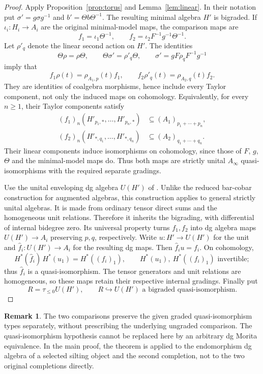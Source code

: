 \documentclass[12pt,a4paper,english,reqno]{amsart}
\theoremstyle{plain}
\theoremstyle{definition}
\newtheorem{rmk}[thm]{Remark}
\numberwithin{equation}{section}
\newcommand{\prpref}[1]{Proposition~\ref{#1}}
\newcommand{\lemref}[1]{Lemma~\ref{#1}}
\def\io{\iota}
\def\ro{\rho}
\def\si{\sigma}
\def\ta{\tau}
\def\Th{\Theta}
\def\incl{\hookrightarrow}
\def\Ainf{A_\infty}
\begin{document}
\begin{proof}
Apply \prpref{prop:torus} and \lemref{lem:linear}. In their notation put $\si'=g\si g^{-1}$ and $b'=\Th b\Th^{-1}$. The resulting minimal algebra $H'$ is bigraded. If $\io_i:H_i\to A_i$ are the original minimal-model maps, the comparison maps are
\[
 f_1=\io_1\Th^{-1},\qquad
 f_2=\io_2F^{-1}g^{-1}\Th^{-1}.
\]
Let $\ro'_q$ denote the linear second action on $H'$. The identities
\[
 \Th\ro=\ro\Th,\qquad
 \Th\si'=\ro'_q\Th,\qquad
 \si'=gF\ro_qF^{-1}g^{-1}
\]
imply that
\[
 f_1\ro(t)=\ro_{A_1,p}(t)f_1,\qquad
 f_2\ro'_q(t)=\ro_{A_2,q}(t)f_2.
\]
They are identities of coalgebra morphisms, hence include every Taylor component, not only the induced maps on cohomology. Equivalently, for every $n\ge1$, their Taylor components satisfy
\[
 \begin{aligned}
 (f_1)_n(H'_{p_1,*},\ldots,H'_{p_n,*})
   &\subseteq(A_1)_{p_1+\cdots+p_n},\\
 (f_2)_n(H'_{*,q_1},\ldots,H'_{*,q_n})
   &\subseteq(A_2)_{q_1+\cdots+q_n}.
 \end{aligned}
\]
Their linear components induce isomorphisms on cohomology, since those of $F$, $g$, $\Th$ and the minimal-model maps do. Thus both maps are strictly unital $\Ainf$ quasi-isomorphisms with the required separate gradings.

Use the unital enveloping dg algebra $U(H')$ of \cite[Proposition 2.1]{COS}. Unlike the reduced bar-cobar construction for augmented algebras, this construction applies to general strictly unital algebras. It is made from ordinary tensor direct sums and the homogeneous unit relations. Therefore it inherits the bigrading, with differential of internal bidegree zero. Its universal property turns $f_1,f_2$ into dg algebra maps $U(H')\to A_i$ preserving $p,q$, respectively. Write $u:H'\to U(H')$ for the unit and $\widehat f_i:U(H')\to A_i$ for the resulting dg maps. Then $\widehat f_i u=f_i$. On cohomology,
\[
 H^*(\widehat f_i)\,H^*(u_1)=H^*((f_i)_1),
 \qquad H^*(u_1),\ H^*((f_i)_1)\text{ invertible};
\]
thus $\widehat f_i$ is a quasi-isomorphism. The tensor generators and unit relations are homogeneous, so these maps retain their respective internal gradings. Finally put
\[
 R=\ta_{\le0}U(H'),\qquad R\incl U(H')\text{ a bigraded quasi-isomorphism}.
\]
\end{proof}

\begin{rmk}
The two comparisons preserve the given graded quasi-isomorphism types separately, without prescribing the underlying ungraded comparison. The quasi-isomorphism hypothesis cannot be replaced here by an arbitrary dg Morita equivalence. In the main proof, the theorem is applied to the endomorphism dg algebra of a selected silting object and the second completion, not to the two original completions directly.
\end{rmk}
\end{document}
